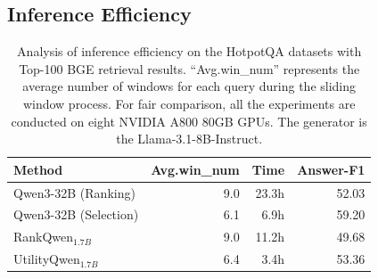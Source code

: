 \subsection{Inference Efficiency}


\begin{table}[t]
  \centering
  \caption{Analysis of inference efficiency on the HotpotQA datasets with Top-100 BGE retrieval results. ``Avg.win\_num'' represents the average number of windows for each query during the sliding window process. For fair comparison, all the experiments are conducted on eight NVIDIA A800 80GB GPUs. The generator is the Llama-3.1-8B-Instruct.}
    \begin{tabular}{lrrr}
    \toprule
    \multicolumn{1}{l}{Method} & Avg.win\_num &  Time & Answer-F1 \\
    \midrule
    Qwen3-32B (Ranking) & 9.0     & 23.3h & 52.03 \\
    Qwen3-32B (Selection) & 6.1   & \phantom{1}6.9h & 59.20 \\
    RankQwen$_{1.7B}$ & 9.0     & 11.2h & 49.68 \\
    UtilityQwen$_{1.7B}$ & 6.4 & \phantom{1}3.4h  & 53.36 \\
    \bottomrule
    \end{tabular}%
 \label{tab:efficiency}%
\end{table}%

